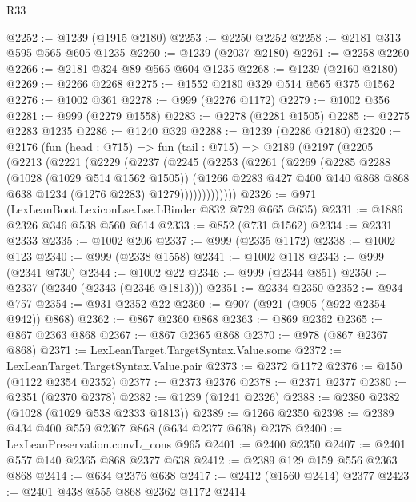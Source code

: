 \begin{lexlean}{R33}
\begin{coremodule}
@2252 := @1239 (@1915 @2180)
@2253 := @2250 @2252
@2258 := @2181 @313 @595 @565 @605 @1235
@2260 := @1239 (@2037 @2180)
@2261 := @2258 @2260
@2266 := @2181 @324 @89 @565 @604 @1235
@2268 := @1239 (@2160 @2180)
@2269 := @2266 @2268
@2275 := @1552 @2180 @329 @514 @565 @375 @1562
@2276 := @1002 @361
@2278 := @999 (@2276 @1172)
@2279 := @1002 @356
@2281 := @999 (@2279 @1558)
@2283 := @2278 (@2281 @1505)
@2285 := @2275 @2283 @1235
@2286 := @1240 @329
@2288 := @1239 (@2286 @2180)
@2320 := @2176
    (fun (head : @715) =>
    fun (tail : @715) =>
    @2189
      (@2197
        (@2205
          (@2213
            (@2221
              (@2229
                (@2237
                  (@2245
                    (@2253
                      (@2261
                        (@2269
                          (@2285
                            @2288
                            (@1028 (@1029 @514 @1562 @1505))
                            (@1266
                              @2283
                              @427
                              @400
                              @140
                              @868
                              @868
                              @638
                              @1234
                              (@1276 @2283)
                              @1279)))))))))))))
@2326 := @971 (LexLeanBoot.LexiconLse.Lse.LBinder @832 @729 @665 @635)
@2331 := @1886 @2326 @346 @538 @560 @614
@2333 := @852 (@731 @1562)
@2334 := @2331 @2333
@2335 := @1002 @206
@2337 := @999 (@2335 @1172)
@2338 := @1002 @123
@2340 := @999 (@2338 @1558)
@2341 := @1002 @118
@2343 := @999 (@2341 @730)
@2344 := @1002 @22
@2346 := @999 (@2344 @851)
@2350 := @2337 (@2340 (@2343 (@2346 @1813)))
@2351 := @2334 @2350
@2352 := @934 @757
@2354 := @931 @2352 @22
@2360 := @907 (@921 (@905 (@922 @2354 @942)) @868)
@2362 := @867 @2360 @868
@2363 := @869 @2362
@2365 := @867 @2363 @868
@2367 := @867 @2365 @868
@2370 := @978 (@867 @2367 @868)
@2371 := LexLeanTarget.TargetSyntax.Value.some
@2372 := LexLeanTarget.TargetSyntax.Value.pair
@2373 := @2372 @1172
@2376 := @150 (@1122 @2354 @2352)
@2377 := @2373 @2376
@2378 := @2371 @2377
@2380 := @2351 (@2370 @2378)
@2382 := @1239 (@1241 @2326)
@2388 := @2380 @2382 (@1028 (@1029 @538 @2333 @1813))
@2389 := @1266 @2350
@2398 := @2389 @434 @400 @559 @2367 @868 (@634 @2377 @638) @2378
@2400 := LexLeanPreservation.convL_cons @965
@2401 := @2400 @2350
@2407 := @2401 @557 @140 @2365 @868 @2377 @638
@2412 := @2389 @129 @159 @556 @2363 @868
@2414 := @634 @2376 @638
@2417 := @2412 (@1560 @2414) @2377
@2423 := @2401 @438 @555 @868 @2362 @1172 @2414

\end{coremodule}
\end{lexlean}
